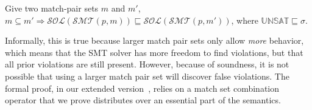 \begin{theorem}[Approximation]
Give two match-pair sets $m$ and $m'$, $m \subseteq m' \Rightarrow \mathcal{SOL}(\mathcal{SMT}(p, m))
  \sqsubseteq \mathcal{SOL}(\mathcal{SMT}(p, m'))$, where
  $\mathbb{UNSAT} \sqsubseteq \sigma$.
\end{theorem}

Informally, this is true because larger match pair sets only allow
\emph{more} behavior, which means that the SMT solver has more freedom
to find violations, but that all prior violations are still
present. However, because of soundness, it is not possible that using
a larger match pair set will discover false violations. The formal
proof, in our extended version~\cite{extended-version}, relies on a
match set combination operator that we prove distributes over an
essential part of the semantics.

